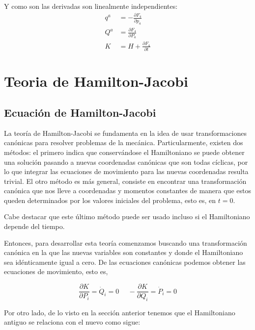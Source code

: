 \documentclass[12pt]{report}
\begin{document}
Y como son las derivadas son linealmente independientes:
	\begin{align*}
		q^{a} &= -\frac{\partial F_{4}}{\partial p_{a}}\\
		Q^{a} &= \frac{\partial F_{4}}{\partial P_{a}} \\
		K &= H + \frac{\partial F_{4}}{\partial t}
	\end{align*}












\chapter{Teoria de Hamilton-Jacobi}

\section{Ecuación de Hamilton-Jacobi}
La teoría de Hamilton-Jacobi se fundamenta en la idea de usar transformaciones canónicas para resolver problemas de la mecánica. Particularmente, existen dos métodos: el primero indica que conservándose el Hamiltoniano se puede obtener una solución pasando a nuevas coordenadas canónicas que son todas cíclicas, por lo que integrar las ecuaciones de movimiento para las nuevas coordenadas resulta trivial. El otro método es más general, consiste en encontrar una transformación canónica que nos lleve a coordenadas y momentos constantes de manera que estos queden determinados por los valores iniciales del problema, esto es, en $t=0$.

 Cabe destacar que este último método puede ser usado incluso si el Hamiltoniano depende del tiempo.\par
Entonces, para desarrollar esta teoría comenzamos buscando una transformación canónica en la que las nuevas variables son constantes y donde el Hamiltoniano sea idénticamente igual a cero. De las ecuaciones canónicas podemos obtener las ecuaciones de movimiento, esto es,

\begin{equation}
 \frac{\partial K}{\partial P_i}=\dot{Q}_i=0 \ \ \ \ \ \ -\frac{\partial K}{\partial Q_i}=\dot{P}_i=0
\end{equation}

Por otro lado, de lo visto en la sección anterior tenemos que el Hamiltoniano antiguo se relaciona con el nuevo como sigue:
\end{document}

